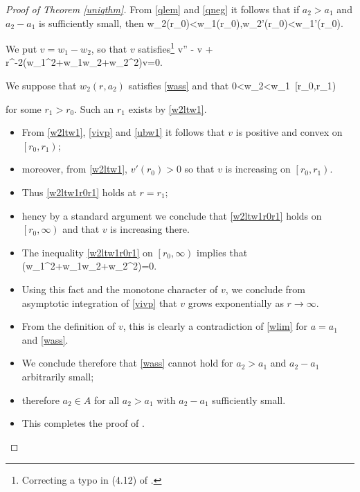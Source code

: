 \begin{proof}[Proof of Theorem \ref{uniqthm}]
    From \cref{qlem} and \eqref{qneg} it follows that if $a_2>a_1$ and $a_2-a_1$
    is sufficiently small, then
    \be\label{w2ltw1} w_2(r_0)<w_1(r_0),\quad w_2'(r_0)<w_1'(r_0).\ee

    We put $v = w_1-w_2$, so that $v$ satisfies\footnote{Correcting a 
    typo in (4.12) of \cite{coffm}.}
    \be\label{vivp} v'' - v + r^{-2}\left(w_1^2+w_1w_2+w_2^2\right)v=0.\ee

    We suppose that $w_2(r,a_2)$ satisfies \eqref{wass} and that
    \be\label{w2ltw1r0r1} 0<w_2<w_1\quad{}~\left[r_0,r_1\right)\ee

    for some $r_1>r_0$. Such an $r_1$ exists by \eqref{w2ltw1}.
    \begin{itemize}
        \item From \eqref{w2ltw1}, \eqref{vivp} and \eqref{ubw1} it follows that
            $v$ is positive and convex on $\left[r_0, r_1\right)$; 
        \item moreover, from \eqref{w2ltw1}, $v'(r_0)>0$ so that $v$ is
            increasing on $\left[r_0, r_1\right)$. 
        \item Thus \eqref{w2ltw1r0r1} holds at $r=r_1$;
        \item hency by a standard argument we conclude that \eqref{w2ltw1r0r1}
            holds on $\left[r_0, \infty\right)$ and that $v$ is increasing
            there. 
        \item The inequality \eqref{w2ltw1r0r1} on $\left[r_0, \infty\right)$
            implies that
            \be\label{wlimsumsq}
                \left(w_1^2+w_1w_2+w_2^2\right)=0.
            \ee
        \item Using this fact and the monotone character of $v$, we conclude
            from asymptotic integration of \eqref{vivp} that $v$ grows
            exponentially as $r\to\infty$.
        \item From the definition of $v$, this is clearly a contradiction of
            \eqref{wlim} for $a=a_1$ and \eqref{wass}. 
        \item We conclude therefore that \eqref{wass} cannot hold for $a_2>a_1$
            and $a_2-a_1$ arbitrarily small;
        \item therefore $a_2\in A$ for all $a_2>a_1$ with $a_2-a_1$ sufficiently
            small. 
        \item This completes the proof of .
    \end{itemize}
\end{proof}

